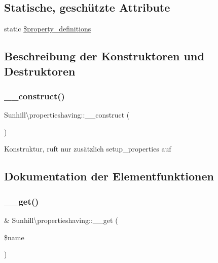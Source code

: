 \subsection*{Statische, geschützte Attribute}
\begin{DoxyCompactItemize}
\item 
static \hyperlink{classSunhill_1_1propertieshaving_a6e532e370446f606723fee6b325e352b}{\$property\+\_\+definitions}
\end{DoxyCompactItemize}


\subsection{Beschreibung der Konstruktoren und Destruktoren}
\mbox{\label{classSunhill_1_1propertieshaving_a69da40ae99f4c28cbe1292ef21e829cd}} 
\subsubsection{\texorpdfstring{\+\_\+\+\_\+construct()}{\_\_construct()}}
{\footnotesize\ttfamily Sunhill\textbackslash{}propertieshaving\+::\+\_\+\+\_\+construct (\begin{DoxyParamCaption}{ }\end{DoxyParamCaption})}

Konstruktur, ruft nur zusätzlich setup\+\_\+properties auf 

\subsection{Dokumentation der Elementfunktionen}
\mbox{\label{classSunhill_1_1propertieshaving_ae8ca869ba942b1d32df0be253dca1975}} 
\subsubsection{\texorpdfstring{\+\_\+\+\_\+get()}{\_\_get()}}
{\footnotesize\ttfamily \& Sunhill\textbackslash{}propertieshaving\+::\+\_\+\+\_\+get (\begin{DoxyParamCaption}\item[{}]{\$name }\end{DoxyParamCaption})}

